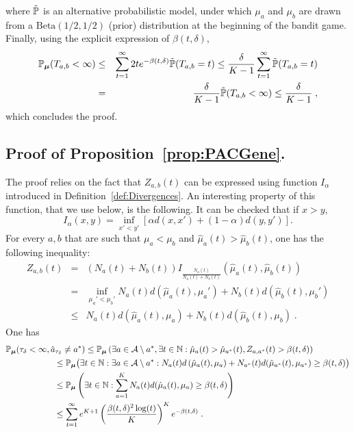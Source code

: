 \documentclass{colt2016} %
\begin{document}
where $\tilde{\mathbb{P}}$ is an alternative probabilistic model, under which $\mu_a$ and $\mu_b$ are drawn from a $\mathrm{Beta}(1/2,1/2)$ (prior) distribution at the beginning of the bandit game. Finally, using the explicit expression of $\beta(t,\delta)$,
\begin{eqnarray*}
 \mathbb{P}_{\bm \mu}(T_{a,b}< \infty) & \leq & \sum_{t=1}^\infty 2t e^{-\beta(t,\delta)} \tilde{\mathbb{P}}(T_{a,b}=t) \leq \frac{\delta}{K-1} \sum_{t=1}^\infty \tilde{\mathbb{P}}(T_{a,b}=t) \\ &= &\frac{\delta}{K-1} \tilde{\mathbb{P}}(T_{a,b}< \infty) \leq \frac{\delta}{K-1}\;,
\end{eqnarray*}
which concludes the proof.




\subsection{Proof of Proposition~\ref{prop:PACGene}.}\label{proof:PACGene} The proof relies on the fact that $Z_{a,b}(t)$ can be expressed using function $I_{\alpha}$ introduced in Definition~\ref{def:Divergences}. An interesting property of this function, that we use below, is the following. It can be checked that if $x > y$, 
\[I_\alpha(x,y) = \inf_{x'<y'} \left[\alpha d(x,x') + (1-\alpha)d(y,y')\right].\]
For every $a,b$ that are such that $\mu_a<\mu_b$ and $\hat{\mu}_a(t)>\hat{\mu}_b(t)$, one has the following inequality: 
\begin{eqnarray*}
Z_{a,b}(t) &=& (N_a(t) + N_b(t)) I_{\frac{N_a(t)}{N_a(t) + N_b(t)}}\left(\hat{\mu}_a(t),\hat{\mu}_b(t)\right) \\
 &= &\inf_{\mu_a'<\mu_b'}{N_a(t)}d(\hat{\mu}_{a}(t),\mu_a') + {N_b(t)}d(\hat{\mu}_{b}(t),\mu_b')  \\
&\leq & {N_a(t)d\left(\hat{\mu}_{a}(t),\mu_a\right) + N_b(t)d(\hat{\mu}_b(t),\mu_b)}\;.
\end{eqnarray*}
One has
\begin{align*}
 & \mathbb{P}_{\bm\mu}(\tau_\delta<\infty,\hat{a}_{\tau_\delta}\neq a^*)   \leq   \mathbb{P}_{\bm\mu}\left(\exists a \in \mathcal{A}\setminus a^*, \exists t \in \mathbb{N} : \hat{\mu}_a(t)> \hat{\mu}_{a^*}(t), Z_{a,a^*}(t) > \beta(t,\delta)\right) \\
& \hspace{2cm}\leq \mathbb{P}_{\bm\mu}\big(\exists t\in \mathbb{N} : \exists a\in \mathcal{A}\setminus a^* :  N_a(t)d\left(\hat{\mu}_{a}(t),\mu_a\right) + N_{a^*}(t)d(\hat{\mu}_{a^*}(t),\mu_{a^*}) \geq \beta(t,\delta)\big)\\
& \hspace{2cm}\leq \mathbb{P}_{\bm\mu}\left(\exists t\in \mathbb{N} : \sum_{a=1}^K N_a(t) d(\hat{\mu}_a(t),\mu_a) \geq \beta(t,\delta)\right) \\
& \hspace{2cm}\leq \sum_{t=1}^\infty e^{K+1}\left(\frac{\beta(t,\delta)^2\log(t)}{K}\right)^Ke^{-\beta(t,\delta)}\;.
\end{align*}
\end{document}
